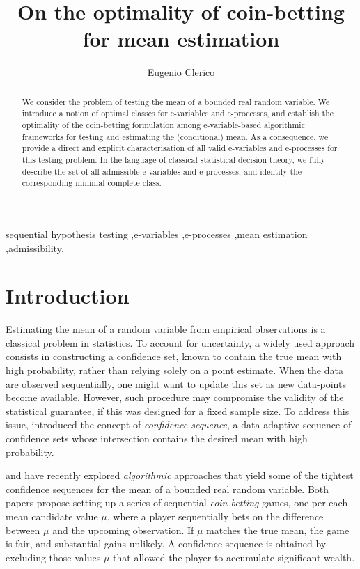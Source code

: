 \documentclass[3p, authoryear, 10pt]{elsarticle}%
\begin{document}
 

\begin{frontmatter}
    \title{On the optimality of coin-betting for mean estimation} %
    \author{Eugenio Clerico}
    \address{Universitat Pompeu Fabra, Barcelona, Spain}
    \begin{abstract}  
        We consider the problem of testing the mean of a bounded real random variable. We introduce a notion of optimal classes for e-variables and e-processes, and establish the optimality of the coin-betting formulation among e-variable-based algorithmic frameworks for testing and estimating the (conditional) mean. As a consequence, we provide a direct and explicit characterisation of all valid e-variables and e-processes for this testing problem. In the language of classical statistical decision theory, we fully describe the set of all admissible e-variables and e-processes, and identify the corresponding minimal complete class.
    \end{abstract}
    \begin{keyword}
        sequential hypothesis testing \sep e-variables \sep e-processes \sep mean estimation  \sep admissibility. 
    \end{keyword}
\end{frontmatter}

\section{Introduction}\label{sec:intro}
Estimating the mean of a random variable from empirical observations is a classical problem in statistics. To account for uncertainty, a widely used approach consists in constructing a confidence set, known to contain the true mean with high probability, rather than relying solely on a point estimate. When the data are observed sequentially, one might want to update this set as new data-points become available. However, such procedure may compromise the validity of the statistical guarantee, if this was designed for a fixed sample size. To address this issue, \citet{darling67confidence} introduced the concept of \emph{confidence sequence}, a data-adaptive sequence of confidence sets whose intersection contains the desired mean with high probability.

\cite{orabona2023tight} and \cite{waudbysmith23estimating} have recently explored \emph{algorithmic} approaches that yield some of the tightest confidence sequences for  the mean of a bounded real random variable. Both papers propose setting up a series of sequential \emph{coin-betting} games, one per each mean candidate value $\mu$, where a player sequentially bets on the difference between $\mu$ and the upcoming observation. If $\mu$ matches the true mean, the game is fair, and substantial gains unlikely. A confidence sequence is  obtained by excluding those values  $\mu$ that allowed the player to accumulate significant wealth. 
\end{document}
